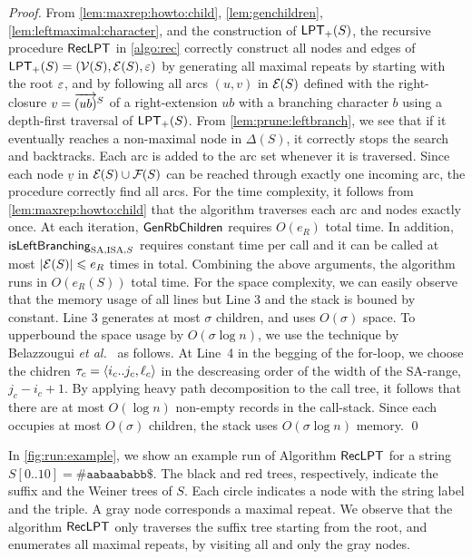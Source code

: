 \begin{proof}
From
\cref{lem:maxrep:howto:child},
\cref{lem:genchildren},
\cref{lem:leftmaximal:character},
and the construction of $\mathsf{LPT}_{+}(S)$, 
the recursive procedure $\textsf{RecLPT}$ in \cref{algo:rec} correctly construct all nodes and edges of $\mathsf{LPT}_{+}(S) = (\mathcal{V}(S), \mathcal{E}(S), \varepsilon)$ by generating all maximal repeats by starting with the root $\varepsilon$, and by following all arcs $(u, v)$ in $\mathcal{E}_{}(S)$ defined with the right-closure $v = \overrightarrow{(ub)}^{S}$ of a right-extension $ub$ with a branching character $b$ using a depth-first traversal of $\mathsf{LPT}_{+}(S)$.
From \cref{lem:prune:leftbranch}, we see that if it eventually reaches a non-maximal node in $\Delta(S)$, it correctly stops the search and backtracks. Each arc is added to the arc set whenever it is traversed. Since each node $\underline v$ in $\mathcal{E}_{}(S)\cup \mathcal{F}_{}(S)$ can be reached through exactly one incoming arc, the procedure correctly find all arcs.
For the time complexity, it follows from \cref{lem:maxrep:howto:child} that the algorithm traverses each arc and nodes exactly once. At each iteration, $\textsf{GenRbChildren}_{}$ requires $O(e_R)$ total time. In addition, $\mbox{\textsf{isLeftBranching}}_{{\mathrm{SA}, \mathrm{ISA}, S}}$ requires constant time per call and it can be called at most $|\mathcal{E}(S)| \leqslant e_R$ times in total. Combining the above arguments, the algorithm runs in $O(e_R(S))$ total time.
For the space complexity, we can easily observe that the memory usage of all lines but Line 3 and the stack is bouned by constant. Line 3 generates at most $\sigma$ children, and uses $O(\sigma)$ space. 
To upperbound the space usage by $O(\sigma\log n)$, we use the technique by Belazzougui \textit{et al.}~\cite{belazzougui2020linear} as follows. At Line~4 in the begging of the for-loop, we choose the chidren $\tau_c = \langle i_c..j_c, \ell_c\rangle$ in the descreasing order of the width of the SA-range, $j_c - i_c + 1$. By applying heavy path decomposition to the call tree, it follows that there are at most $O(\log n)$ non-empty records in the call-stack. Since each occupies at most $O(\sigma)$ children, the stack uses $O(\sigma \log n)$ memory. 
\qed\end{proof}

In \cref{fig:run:example}, we show an example run of Algorithm $\textsf{RecLPT}$ for a string $S[0..10] = \mathtt{\#aabaababb\$}$. The black and red trees, respectively, indicate the suffix and the Weiner trees of $S$. Each circle indicates a node with the string label and the triple. A gray node corresponds a maximal repeat. 
We observe that the algorithm $\textsf{RecLPT}$ only traverses the suffix tree starting from the root, and enumerates all maximal repeats, by visiting all and only the gray nodes. 

